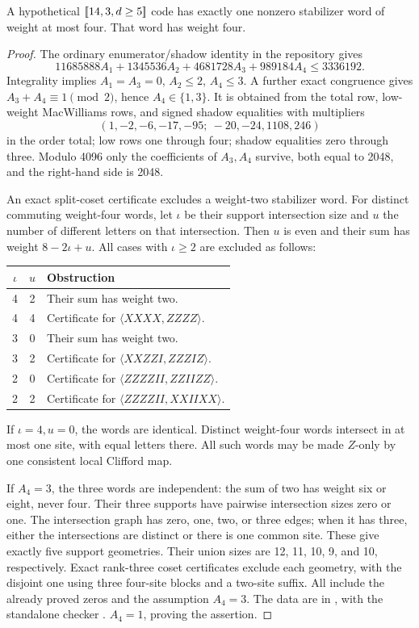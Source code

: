 \begin{proposition}\label{prop:14-local}
A hypothetical \([\![14,3,d\geq5]\!]\) code has exactly one nonzero
stabilizer word of weight at most four. That word has weight four.
\end{proposition}
\begin{proof}
The ordinary enumerator/shadow identity in the repository gives
\[
 11685888A_1+1345536A_2+4681728A_3+989184A_4\leq3336192.
\]
Integrality implies \(A_1=A_3=0\), \(A_2\leq2\), \(A_4\leq3\).
A further exact congruence gives \(A_3+A_4\equiv1\pmod2\), hence
\(A_4\in\{1,3\}\). It is obtained from the total row, low-weight
MacWilliams rows, and signed shadow equalities with multipliers
\[
 (1,-2,-6,-17,-95;\ -20,-24,1108,246)
\]
in the order total; low rows one through four; shadow equalities zero
through three. Modulo 4096 only the coefficients of \(A_3,A_4\)
survive, both equal to 2048, and the right-hand side is 2048.

An exact split-coset certificate excludes a weight-two stabilizer word.
For distinct commuting weight-four words, let \(\iota\) be their support
intersection size and \(u\) the number of different letters on that
intersection. Then \(u\) is even and their sum has weight \(8-2\iota+u\).
All cases with \(\iota\geq2\) are excluded as follows:
\begin{center}\small
\begin{tabular}{@{}ccl@{}}\toprule
\(\iota\)&\(u\)&Obstruction\\\midrule
4&2&Their sum has weight two.\\
4&4&Certificate for \(\langle XXXX,ZZZZ\rangle\).\\
3&0&Their sum has weight two.\\
3&2&Certificate for \(\langle XXZZI,ZZZIZ\rangle\).\\
2&0&Certificate for \(\langle ZZZZII,ZZIIZZ\rangle\).\\
2&2&Certificate for \(\langle ZZZZII,XXIIXX\rangle\).\\\bottomrule
\end{tabular}
\end{center}
If \(\iota=4,u=0\), the words are identical. Distinct weight-four
words intersect in at most one site, with equal letters there. All such
words may be made \(Z\)-only by one consistent local Clifford map.

If \(A_4=3\), the three words are independent: the sum of two has weight
six or eight, never four. Their three supports have pairwise intersection
sizes zero or one. The intersection graph has zero, one, two, or three
edges; when it has three, either the intersections are distinct or there
is one common site. These give exactly five support geometries. Their
union sizes are 12, 11, 10, 9, and 10, respectively. Exact rank-three
coset certificates exclude each geometry, with the disjoint one using
three four-site blocks and a two-site suffix. All include the already
proved zeros and the assumption \(A_4=3\). The data are in , with the
standalone checker . \(A_4=1\), proving the assertion.
\end{proof}


